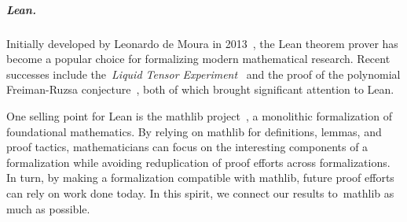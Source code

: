 \subparagraph*{Lean.}
Initially developed by Leonardo de Moura in 2013~\cite{demouraLeanTheoremProver2015},
the Lean theorem prover has become a popular choice for formalizing modern mathematical research.
Recent successes include the~\emph{Liquid Tensor Experiment}~\cite{Castelvecchi2021}
and the proof of the polynomial Freiman-Ruzsa conjecture~\cite{gowers2023conjecture, slomanATeamMathProves2023},
both of which brought significant attention to Lean.

One selling point for Lean is the \textsf{mathlib} project~\cite{The_mathlib_Community_2020},
a monolithic formalization of foundational mathematics.
By relying on \textsf{mathlib} for definitions, lemmas, and proof tactics,
mathematicians can focus on the interesting components of a formalization
while avoiding reduplication of proof efforts across formalizations.
In turn, by making a formalization compatible with \textsf{mathlib},
future proof efforts can rely on work done today.
In this spirit, we connect our results to~\textsf{mathlib} as much as possible.

